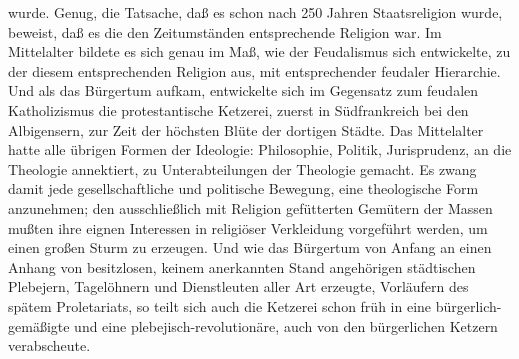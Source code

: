wurde. Genug, die Tatsache, daß es schon nach 250 Jahren Staatsreligion
wurde, beweist, daß es die den Zeitumständen entsprechende Religion war.
Im Mittelalter bildete es sich genau im Maß, wie der Feudalismus sich
entwickelte, zu der diesem entsprechenden Religion aus, mit
entsprechender feudaler Hierarchie. Und als das Bürgertum aufkam,
entwickelte sich im Gegensatz zum feudalen Katholizismus die
protestantische Ketzerei, zuerst in Südfrankreich bei den Albigensern,
zur Zeit der höchsten Blüte der dortigen Städte. Das Mittelalter hatte
alle übrigen Formen der Ideologie: Philosophie, Politik, Jurisprudenz,
an die Theologie annektiert, zu Unterabteilungen der Theologie gemacht.
Es zwang damit jede gesellschaftliche und politische Bewegung, eine
theologische Form anzunehmen; den ausschließlich mit Religion
gefütterten Gemütern der Massen mußten ihre eignen Interessen in
religiöser Verkleidung vorgeführt werden, um einen großen Sturm zu
erzeugen. \textbar{} Und wie das Bürgertum von Anfang an einen Anhang von
besitzlosen, keinem anerkannten Stand angehörigen städtischen Plebejern,
Tagelöhnern und Dienstleuten aller Art erzeugte, Vorläufern des spätem
Proletariats, \textbar{} so teilt sich auch die Ketzerei schon früh in eine
bürgerlich-gemäßigte und eine plebejisch-revolutionäre, auch von den
bürgerlichen Ketzern verabscheute.

